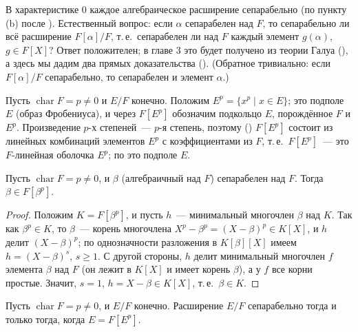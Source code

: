 В характеристике $0$ каждое алгебраическое расширение сепарабельно (по пункту (b) после ). Естественный вопрос:
если $\alpha$ сепарабелен над $F$, то сепарабельно ли всё расширение $F[\alpha]/F$, т.\,е.\ сепарабелен ли над $F$
каждый элемент $g(\alpha)$, $g\in F[X]$? Ответ положителен; в главе 3 это будет получено из теории Галуа (), а
здесь мы дадим два прямых доказательства (). (Обратное тривиально: если $F[\alpha]/F$ сепарабельно, то
сепарабелен и элемент $\alpha$.)

Пусть $\operatorname{char}F=p\ne0$ и $E/F$ конечно. Положим $E^p=\{x^p\mid x\in E\}$; это подполе $E$ (образ
Фробениуса), и через $F[E^p]$ обозначим подкольцо $E$, порождённое $F$ и $E^p$. Произведение $p$-х степеней~---
$p$-я степень, поэтому () $F[E^p]$ состоит из линейных комбинаций элементов $E^p$ с коэффициентами из $F$, т.\,е.\
$F[E^p]$~--- это $F$-линейная оболочка $E^p$; по  это подполе $E$.

\begin{lemma}[2.22e]
Пусть $\operatorname{char}F=p\ne0$, и $\beta$ (алгебраичный над $F$) сепарабелен над $F$. Тогда $\beta\in F[\beta^p]$.
\end{lemma}

\begin{proof}
Положим $K=F[\beta^p]$, и пусть $h$~--- минимальный многочлен $\beta$ над $K$. Так как $\beta^p\in K$, то $\beta$~---
корень многочлена $X^p-\beta^p=(X-\beta)^p\in K[X]$, и $h$ делит $(X-\beta)^p$; по однозначности разложения в
$K[\beta][X]$ имеем $h=(X-\beta)^s$, $s\ge1$. С другой стороны, $h$ делит минимальный многочлен $f$ элемента $\beta$ над
$F$ (он лежит в $K[X]$ и имеет корень $\beta$), а у $f$ все корни простые. Значит, $s=1$, $h=X-\beta\in K[X]$, т.\,е.\
$\beta\in K$.
\end{proof}

\begin{theorem}[2.22f]
Пусть $\operatorname{char}F=p\ne0$, и $E/F$ конечно. Расширение $E/F$ сепарабельно тогда и только тогда, когда
$E=F[E^p]$.
\end{theorem}

